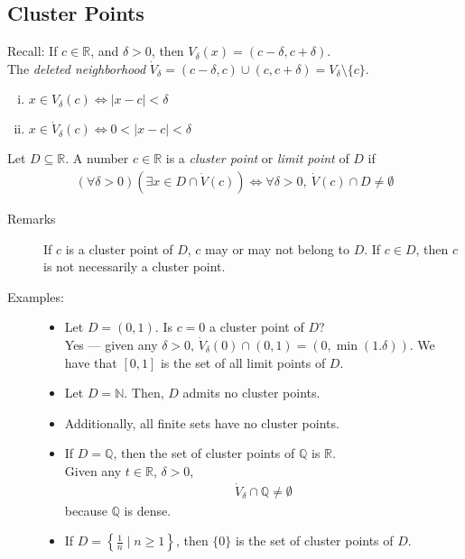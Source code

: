 \documentclass[10pt]{extarticle}
\newcommand{\N}{\mathbb{N}}
\newcommand{\Q}{\mathbb{Q}}
\newcommand{\R}{\mathbb{R}}
\begin{document}
  \subsection{Cluster Points}%
    Recall: If $c\in\R$, and $\delta > 0$, then $V_{\delta}(x) = (c-\delta, c+\delta)$.\\

    The \textit{deleted neighborhood} $\dot{V}_{\delta} = (c-\delta,c) \cup (c,c+\delta) = V_{\delta}\setminus \{c\}$.
    \begin{enumerate}[(i)]
      \item $x\in V_{\delta}(c) \Leftrightarrow |x-c| < \delta$
      \item $x\in \dot{V}_{\delta}(c) \Leftrightarrow 0 < |x-c| < \delta$
    \end{enumerate}
    Let $D \subseteq \R$. A number $c\in\R$ is a \textit{cluster point} or \textit{limit point} of $D$ if 
    \begin{align*}
      (\forall \delta > 0)(\exists x\in D \cap \dot{V}(c)) \Leftrightarrow \forall \delta > 0,~\dot{V}(c)\cap D \neq \emptyset
    \end{align*}
    \begin{description}
      \item[Remarks] If $c$ is a cluster point of $D$, $c$ may or may not belong to $D$. If $c\in D$, then $c$ is not necessarily a cluster point.
      \item[Examples:]\hfill
        \begin{itemize}
          \item Let $D = (0,1)$. Is $c = 0$ a cluster point of $D$?\\

            Yes --- given any $\delta > 0$, $\dot{V}_{\delta}(0) \cap (0,1) = (0,\min(1.\delta))$. We have that $[0,1]$ is the set of all limit points of $D$.
          \item Let $D = \N$. Then, $D$ admits no cluster points.
          \item Additionally, all finite sets have no cluster points.
          \item If $D = \Q$, then the set of cluster points of $\Q$ is $\R$.\\

            Given any $t\in\R$, $\delta > 0$,
            \begin{align*}
              \dot{V}_{\delta} \cap \Q \neq \emptyset
            \end{align*}
            because $\Q$ is dense.
          \item If $D = \left\{\frac{1}{n}\mid n\geq 1\right\}$, then $\{0\}$ is the set of cluster points of $D$.
        \end{itemize}
    \end{description}
\end{document}
